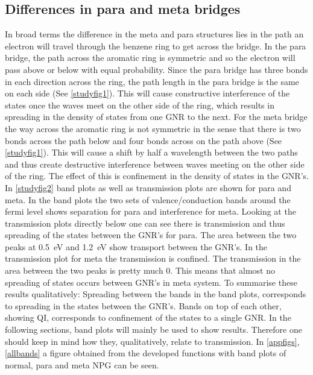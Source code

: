 \subsection{Differences in para and meta bridges}\label{metaparasection}
In broad terms the difference in the meta and para structures lies in the path an electron will travel through the benzene ring to get across the bridge. In the para bridge, the path across the aromatic ring is symmetric and so the electron will pass above or below with equal probability. Since the para bridge has three bonds in each direction across the ring, the path length in the para bridge is the same on each side (See \cref{studyfig1}). This will cause constructive interference of the states once the waves meet on the other side of the ring, which results in spreading in the density of states from one GNR to the next. For the meta bridge the way across the aromatic ring is not symmetric in the sense that there is two bonds across the path below and four bonds across on the path above (See \cref{studyfig1}). This will cause a shift by half a wavelength between the two paths and thus create destructive interference between waves meeting on the other side of the ring. The effect of this is confinement in the density of states in the GNR's. In \cref{studyfig2} band plots as well as transmission plots are shown for para and meta. In the band plots the two sets of valence/conduction bands around the fermi level shows separation for para and interference for meta. Looking at the transmission plots directly below one can see there is transmission  and thus spreading of the states between the GNR's for para. The area between the two peaks at \SI{0.5}{\electronvolt} and  \SI{1.2}{\electronvolt} show transport between the GNR's. In the transmission plot for meta the transmission is confined. The transmission in the area between the two peaks is pretty much 0. This means that almost no spreading of states occurs between GNR's in meta system. To summarise these results qualitatively: Spreading between the bands in the band plots, corresponds to spreading in the states between the GNR's. Bands on top of each other, showing QI, corresponds to confinement of the states to a single GNR. In the following sections, band plots will mainly be used to show results. Therefore one should keep in mind how they, qualitatively, relate to transmission. In \cref{appfigs}, \cref{allbands} a figure obtained from the developed functions with band plots of normal, para and meta NPG can be seen.

